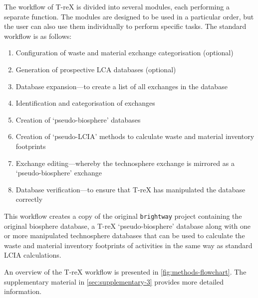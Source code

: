 \documentclass[a4paper,fleqn]{cas-dc}
\begin{document}
The workflow of T-reX is divided into several modules, each performing a
separate function. The modules are designed to be used in a particular order,
but the user can also use them individually to perform specific tasks. The
standard workflow is as follows:

\begin{enumerate}
	\item Configuration of waste and material exchange categorisation (optional)
	\item Generation of prospective LCA databases (optional)
	\item Database expansion---to create a list of all exchanges in the database
	\item Identification and categorisation of exchanges
	\item Creation of `pseudo-biosphere' databases
	\item Creation of `pseudo-LCIA' methods to calculate waste and material inventory
	      footprints
	\item Exchange editing---whereby the technosphere exchange is mirrored as a
	      `pseudo-biosphere' exchange
	\item Database verification---to ensure that T-reX has manipulated the database
	      correctly
\end{enumerate}

This workflow creates a copy of the original \texttt{brightway} project
containing the original biosphere database, a T-reX `pseudo-biosphere' database
along with one or more manipulated technosphere databases that can be used to
calculate the waste and material inventory footprints of activities in the same
way as standard LCIA calculations.

An overview of the T-reX workflow is presented in
\autoref{fig:methods-flowchart}. The supplementary material in
\autoref{sec:supplementary-3} provides more detailed information.
\end{document}
